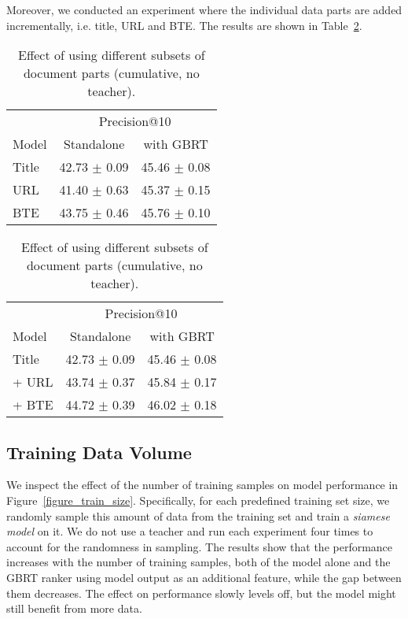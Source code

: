 \documentclass[letterpaper]{article} \usepackage{aaai22 }  \usepackage{times}  \usepackage{helvet}  \usepackage{courier}  \usepackage[hyphens]{url}  \usepackage{graphicx} \usepackage{amsmath,amsfonts,amssymb, mathabx,bm,bbm}
\begin{document}
Moreover, we conducted an experiment where the individual data parts are added incrementally, i.e. title, URL and BTE. The results are shown in Table~\ref{table:dataset_additive_parts}.

\begin{table}[!htb]
    \centering\footnotesize
    \begin{tabular}{lcc}\toprule
    & \multicolumn{2}{c}{Precision@10}\\
    Model & Standalone & with GBRT \\\midrule
    Title & 42.73 $\pm$ 0.09 & 45.46 $\pm$ 0.08\\
URL & 41.40 $\pm$ 0.63 & 45.37 $\pm$ 0.15 \\
BTE & 43.75 $\pm$ 0.46 & 45.76 $\pm$ 0.10 \\\bottomrule
\end{tabular}
    \caption{Effect of using only a single data part (no teacher).}
    \label{table:dataset_single_parts}
    
    \vspace{0.5cm}
    \begin{tabular}{lcc}\toprule
    & \multicolumn{2}{c}{Precision@10}\\
    Model & Standalone & with GBRT \\\midrule
    Title & 42.73 $\pm$ 0.09 & 45.46 $\pm$ 0.08\\
     + URL & 43.74 $\pm$ 0.37 & 45.84  $\pm$ 0.17 \\
     + BTE & 44.72 $\pm$ 0.39  & 46.02 $\pm$ 0.18 \\\bottomrule
\end{tabular}
    \caption{Effect of using different subsets of document parts (cumulative, no teacher).}
    \label{table:dataset_additive_parts}

\end{table}


\subsection{Training Data Volume}

We inspect the effect of the number of training samples on model performance in Figure~\ref{figure_train_size}. Specifically, for each predefined training set size, we randomly sample this amount of data from the training set and train a \textit{siamese model} on it. We do not use a teacher and run each experiment four times to account for the randomness in sampling. The results show that the performance increases with the number of training samples, both of the model alone and the GBRT ranker using model output as an additional feature, while the gap between them decreases. The effect on performance slowly levels off, but the model might still benefit from more data.
\end{document}
